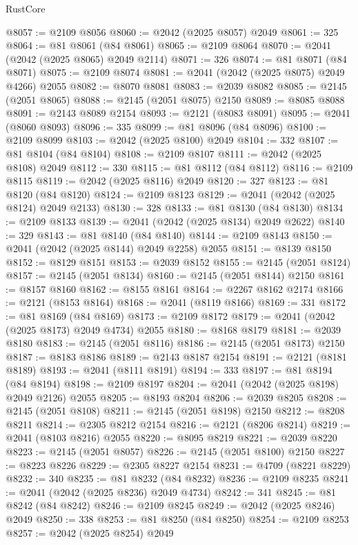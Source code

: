 \begin{lexlean}{RustCore}
\begin{coremodule}
@8057 := @2109 @8056
@8060 := @2042 (@2025 @8057) @2049
@8061 := 325
@8064 := @81 @8061 (@84 @8061)
@8065 := @2109 @8064
@8070 := @2041 (@2042 (@2025 @8065) @2049 @2114)
@8071 := 326
@8074 := @81 @8071 (@84 @8071)
@8075 := @2109 @8074
@8081 := @2041 (@2042 (@2025 @8075) @2049 @4266) @2055
@8082 := @8070 @8081
@8083 := @2039 @8082
@8085 := @2145 (@2051 @8065)
@8088 := @2145 (@2051 @8075) @2150
@8089 := @8085 @8088
@8091 := @2143 @8089 @2154
@8093 := @2121 (@8083 @8091)
@8095 := @2041 (@8060 @8093)
@8096 := 335
@8099 := @81 @8096 (@84 @8096)
@8100 := @2109 @8099
@8103 := @2042 (@2025 @8100) @2049
@8104 := 332
@8107 := @81 @8104 (@84 @8104)
@8108 := @2109 @8107
@8111 := @2042 (@2025 @8108) @2049
@8112 := 330
@8115 := @81 @8112 (@84 @8112)
@8116 := @2109 @8115
@8119 := @2042 (@2025 @8116) @2049
@8120 := 327
@8123 := @81 @8120 (@84 @8120)
@8124 := @2109 @8123
@8129 := @2041 (@2042 (@2025 @8124) @2049 @2133)
@8130 := 328
@8133 := @81 @8130 (@84 @8130)
@8134 := @2109 @8133
@8139 := @2041 (@2042 (@2025 @8134) @2049 @2622)
@8140 := 329
@8143 := @81 @8140 (@84 @8140)
@8144 := @2109 @8143
@8150 := @2041 (@2042 (@2025 @8144) @2049 @2258) @2055
@8151 := @8139 @8150
@8152 := @8129 @8151
@8153 := @2039 @8152
@8155 := @2145 (@2051 @8124)
@8157 := @2145 (@2051 @8134)
@8160 := @2145 (@2051 @8144) @2150
@8161 := @8157 @8160
@8162 := @8155 @8161
@8164 := @2267 @8162 @2174
@8166 := @2121 (@8153 @8164)
@8168 := @2041 (@8119 @8166)
@8169 := 331
@8172 := @81 @8169 (@84 @8169)
@8173 := @2109 @8172
@8179 := @2041 (@2042 (@2025 @8173) @2049 @4734) @2055
@8180 := @8168 @8179
@8181 := @2039 @8180
@8183 := @2145 (@2051 @8116)
@8186 := @2145 (@2051 @8173) @2150
@8187 := @8183 @8186
@8189 := @2143 @8187 @2154
@8191 := @2121 (@8181 @8189)
@8193 := @2041 (@8111 @8191)
@8194 := 333
@8197 := @81 @8194 (@84 @8194)
@8198 := @2109 @8197
@8204 := @2041 (@2042 (@2025 @8198) @2049 @2126) @2055
@8205 := @8193 @8204
@8206 := @2039 @8205
@8208 := @2145 (@2051 @8108)
@8211 := @2145 (@2051 @8198) @2150
@8212 := @8208 @8211
@8214 := @2305 @8212 @2154
@8216 := @2121 (@8206 @8214)
@8219 := @2041 (@8103 @8216) @2055
@8220 := @8095 @8219
@8221 := @2039 @8220
@8223 := @2145 (@2051 @8057)
@8226 := @2145 (@2051 @8100) @2150
@8227 := @8223 @8226
@8229 := @2305 @8227 @2154
@8231 := @4709 (@8221 @8229)
@8232 := 340
@8235 := @81 @8232 (@84 @8232)
@8236 := @2109 @8235
@8241 := @2041 (@2042 (@2025 @8236) @2049 @4734)
@8242 := 341
@8245 := @81 @8242 (@84 @8242)
@8246 := @2109 @8245
@8249 := @2042 (@2025 @8246) @2049
@8250 := 338
@8253 := @81 @8250 (@84 @8250)
@8254 := @2109 @8253
@8257 := @2042 (@2025 @8254) @2049

\end{coremodule}
\end{lexlean}
